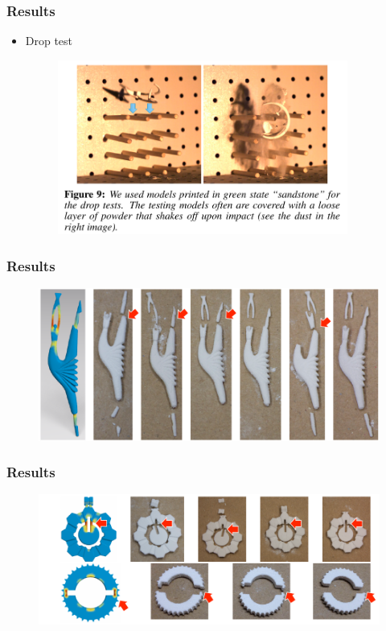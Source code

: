 \documentclass[serif,mathserif, 12pt]{beamer}
\begin{document}
\begin{frame}
  \frametitle{Results}
  \begin{itemize}
  \item Drop test
    \begin{figure}
      \centering
      \includegraphics[width=0.9\textwidth]{img/drop_test}
    \end{figure}
  \end{itemize}
\end{frame}

\begin{frame}
  \frametitle{Results}
  \begin{figure}
    \centering
    \includegraphics[width=\textwidth]{img/drop_dance}
  \end{figure}
\end{frame}

\begin{frame}
  \frametitle{Results}
  \begin{figure}
    \centering
    \includegraphics[width=\textwidth]{img/drop_nut}
  \end{figure}
\end{frame}
\end{document}
